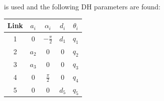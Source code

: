 is used and the following DH parameters are found:
\begin{center}
    \begin{tabular}{|c|c|c|c|c|}
         \hline
         Link & $a_i$ & $\alpha_i$ & $d_i$ & $\theta_i$ \\ \hline
         1 & 0 & $-\frac{\pi}{2}$ & $d_1$ & $q_1$ \\
         2 & $a_2$ & 0 & 0 & $q_2$ \\ 
         3 & $a_3$ & 0 & 0 & $q_3$\\
         4 & 0 & $\frac{\pi}{2}$ & 0 & $q_4$\\
         5 & 0 & 0 & $d_5$ & $q_5$\\
         \hline
    \end{tabular}
\end{center}


